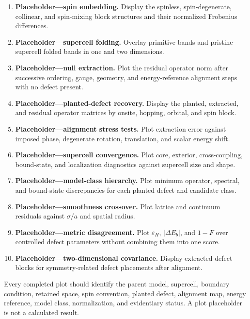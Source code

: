 \begin{enumerate}
    \item \textbf{Placeholder---spin embedding.} Display the spinless,
          spin-degenerate, collinear, and spin-mixing block structures and their
          normalized Frobenius differences.
    \item \textbf{Placeholder---supercell folding.} Overlay primitive bands and
          pristine-supercell folded bands in one and two dimensions.
    \item \textbf{Placeholder---null extraction.} Plot the residual operator
          norm after successive ordering, gauge, geometry, and energy-reference
          alignment steps with no defect present.
    \item \textbf{Placeholder---planted-defect recovery.} Display the planted,
          extracted, and residual operator matrices by onsite, hopping, orbital,
          and spin block.
    \item \textbf{Placeholder---alignment stress tests.} Plot extraction error
          against imposed phase, degenerate rotation, translation, and scalar
          energy shift.
    \item \textbf{Placeholder---supercell convergence.} Plot core, exterior,
          cross-coupling, bound-state, and localization diagnostics against
          supercell size and shape.
    \item \textbf{Placeholder---model-class hierarchy.} Plot minimum operator,
          spectral, and bound-state discrepancies for each planted defect and
          candidate class.
    \item \textbf{Placeholder---smoothness crossover.} Plot lattice and
          continuum residuals against $\sigma/a$ and spatial radius.
    \item \textbf{Placeholder---metric disagreement.} Plot
          $\varepsilon_H$, $|\Delta E_b|$, and $1-F$ over controlled defect
          parameters without combining them into one score.
    \item \textbf{Placeholder---two-dimensional covariance.} Display extracted
          defect blocks for symmetry-related defect placements after alignment.
\end{enumerate}
Every completed plot should identify the parent model, supercell, boundary
condition, retained space, spin convention, planted defect, alignment map,
energy reference, model class, normalization, and evidentiary status. A plot
placeholder is not a calculated result.

